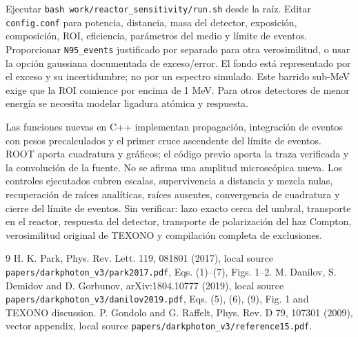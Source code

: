 {Ejecutar \texttt{bash work/reactor\_sensitivity/run.sh} desde la raíz. Editar \texttt{config.conf} para potencia, distancia, masa del detector, exposición, composición, ROI, eficiencia, parámetros del medio y límite de eventos. Proporcionar \texttt{N95\_events} justificado por separado para otra verosimilitud, o usar la opción gaussiana documentada de exceso/error. El fondo está representado por el exceso y su incertidumbre; no por un espectro simulado. Este barrido sub-MeV exige que la ROI comience por encima de 1 MeV. Para otros detectores de menor energía se necesita modelar ligadura atómica y respuesta.}

{Las funciones nuevas en C++ implementan propagación, integración de eventos con pesos precalculados y el primer cruce ascendente del límite de eventos. ROOT aporta cuadratura y gráficos; el código previo aporta la traza verificada y la convolución de la fuente. No se afirma una amplitud microscópica nueva. Los controles ejecutados cubren escalas, supervivencia a distancia y mezcla nulas, recuperación de raíces analíticas, raíces ausentes, convergencia de cuadratura y cierre del límite de eventos. Sin verificar: lazo exacto cerca del umbral, transporte en el reactor, respuesta del detector, transporte de polarización del haz Compton, verosimilitud original de TEXONO y compilación completa de exclusiones.}

\begin{thebibliography}{9}
 H. K. Park, Phys. Rev. Lett. 119, 081801 (2017), local source \texttt{papers/darkphoton\_v3/park2017.pdf}, Eqs. (1)--(7), Figs. 1--2.
 M. Danilov, S. Demidov and D. Gorbunov, arXiv:1804.10777 (2019), local source \texttt{papers/darkphoton\_v3/danilov2019.pdf}, Eqs. (5), (6), (9), Fig. 1 and TEXONO discussion.
 P. Gondolo and G. Raffelt, Phys. Rev. D 79, 107301 (2009), vector appendix, local source \texttt{papers/darkphoton\_v3/reference15.pdf}.
\end{thebibliography}
